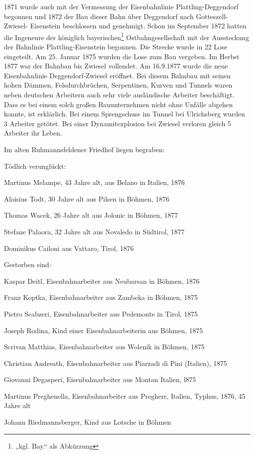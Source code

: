 \documentclass[12pt,a4pager,draft]{book}
\begin{document}
1871 wurde auch mit der Vermessung der Eisenbahnlinie Plattling-Deggendorf
begonnen und 1872 der Bau dieser Bahn über Deggendorf nach Gotteszell-Zwiesel-
Eisenstein beschlossen und genehmigt. Schon im September 1872 hatten die
Ingeneure der königlich bayerischen\footnote{„kgl. Bay.“ als Abkürzung}
Ostbahngesellschaft mit der Aussteckung der Bahnlinie Plattling-Eisenstein
begonnen. Die Strecke wurde in 22 Lose eingeteilt. Am 25. Januar 1875 wurden die
Lose zum Bau vergeben. Im Herbst 1877 war der Bahnbau bis Zwiesel vollendet. Am
16.9.1877 wurde die neue Eisenbahnlinie Deggendorf-Zwiesel eröffnet. Bei diesem
Bahnbau mit seinen hohen Dämmen, Felsdurchbrüchen, Serpentinen, Kurven und
Tunnels waren neben deutschen Arbeitern auch sehr viele ausländische Arbeiter
beschäftigt. Dass es bei einem solch großen Bauunternehmen nicht ohne Unfälle
abgehen konnte, ist erklärlich. Bei einem Sprengschuss im Tunnel bei Ulrichsberg
wurden 3 Arbeiter getötet. Bei einer Dynamitexplosion bei Zwiesel verloren
gleich 5 Arbeiter ihr Leben.

Im alten Ruhmannsfeldener Friedhof liegen begraben:

Tödlich verunglückt:

\begin{compactitem}
\item Martinus Melampe, 43 Jahre alt, aus Belano in Italien, 1876
\item Aloisius Todt, 30 Jahre alt aus Pilsen in Böhmen, 1876
\item Thomas Wacek, 26 Jahre alt aus Jolonic in Böhmen, 1877
\item Stefane Palaora, 32 Jahre alt aus Novaledo in Südtirol, 1877
\item Dominikus Cailoni aus Vattaro, Tirol, 1876
\end{compactitem}

Gestorben sind:

\begin{compactitem}
\item Kaspar Deitl, Eisenbahnarbeiter aus Neubarsan in Böhmen, 1876
\item Franz Koptka, Eisenbahnarbeiter aus Zambeka in Böhmen, 1875
\item Pietro Scabzeri, Eisenbahnarbeiter aus Pedemonte in Tirol, 1875
\item Joseph Rodina, Kind einer Eisenbahnarbeiterin aus Böhmen, 1875
\item Scrivan Matthias, Eisenbahnarbeiter aus Wolenik in Böhmen, 1875
\item Christian Andreath, Eisenbahnarbeiter aus Piarzadi di Pini (Italien), 1875
\item Giovanni Degasperi, Eisenbahnarbeiter aus Montan Italien, l875
\item Martinus Preghenella, Eisenbahnarbeiter aus Pregherr, Italien, Typhus,
1876, 45 Jahre alt
\item Johann Riedmannsberger, Kind aus Lotsche in Böhmen
\end{compactitem}
\end{document}
